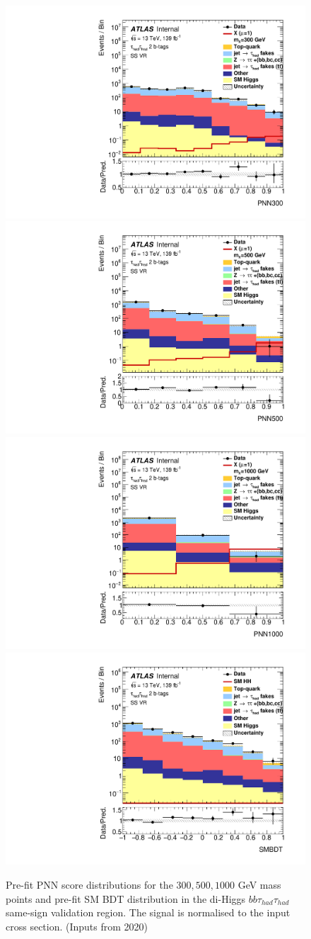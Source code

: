 \begin{figure}
\centering
\includegraphics[width=.45\textwidth]{figures/mva/HH/HadHad/Region_BMin0_incJet1_distPNN300_J2_Y2015_DLLSS_T2_SpcTauHH_L0_Prefitlog.pdf}
\includegraphics[width=.45\textwidth]{figures/mva/HH/HadHad/Region_BMin0_incJet1_distPNN500_J2_Y2015_DLLSS_T2_SpcTauHH_L0_Prefitlog.pdf}\\
\includegraphics[width=.45\textwidth]{figures/mva/HH/HadHad/Region_BMin0_incJet1_distPNN1000_J2_Y2015_DLLSS_T2_SpcTauHH_L0_Prefitlog.pdf}
\includegraphics[width=.45\textwidth]{figures/mva/HH/HadHad/Region_BMin0_incJet1_distSMBDT_J2_Y2015_DLLSS_T2_SpcTauHH_L0_Prefitlog.pdf}
\caption{Pre-fit PNN score distributions for the $300, 500, 1000$ GeV mass points and pre-fit SM BDT distribution in the di-Higgs $bb\tau_{had}\tau_{had}$ same-sign validation region. The signal is normalised to the input cross section. (Inputs from 2020)}
\label{fig:HadHadPreselectionPNNScoreDistributionsSS}
\end{figure}


